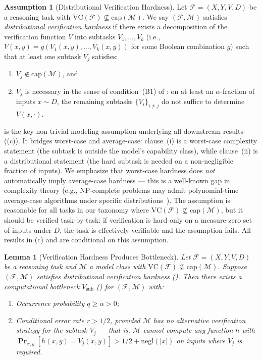\documentclass{article}
\newtheorem{lemma}[theorem]{Lemma}
\theoremstyle{definition}
\newtheorem{assumption}[theorem]{Assumption}
\theoremstyle{remark}
\newcommand{\NP}{\mathrm{NP}}
\newcommand{\VC}{\mathrm{VC}}           %
\newcommand{\calM}{\mathcal{M}}         %
\newcommand{\calF}{\mathcal{F}}         %
\newcommand{\negl}{\mathrm{negl}}
\renewcommand{\Pr}{\operatorname{\mathbf{Pr}}}
\begin{document}
\begin{assumption}[Distributional Verification Hardness]
\label{asm:dist_hard}
Let $\calF = (X, Y, V, D)$ be a reasoning task with $\VC(\calF) \not\subseteq \mathrm{cap}(\calM)$.
We say $(\calF, \calM)$ satisfies \emph{distributional verification hardness} if there exists a decomposition of the verification function $V$ into subtasks $V_1, \ldots, V_k$ (i.e., $V(x,y) = g(V_1(x,y), \ldots, V_k(x,y))$ for some Boolean combination $g$) such that at least one subtask $V_j$ satisfies:
\begin{enumerate}[label=(\roman*)]
    \item $V_j \notin \mathrm{cap}(\calM)$, and
    \item $V_j$ is necessary in the sense of condition~(B1) of : on at least an $\alpha$-fraction of inputs $x \sim D$, the remaining subtasks $\{V_i\}_{i \neq j}$ do not suffice to determine $V(x,\cdot)$.
\end{enumerate}
\end{assumption}

 is the key non-trivial modeling assumption underlying all downstream results ((c)).
It bridges worst-case and average-case: clause~(i) is a worst-case complexity statement (the subtask is outside the model's capability class), while clause~(ii) is a distributional statement (the hard subtask is needed on a non-negligible fraction of inputs).
We emphasize that worst-case hardness does \emph{not} automatically imply average-case hardness --- this is a well-known gap in complexity theory (e.g., $\NP$-complete problems may admit polynomial-time average-case algorithms under specific distributions~\citep{bogdanov2006average}).
The assumption is reasonable for all tasks in our taxonomy where $\VC(\calF) \not\subseteq \mathrm{cap}(\calM)$, but it should be verified task-by-task: if verification is hard only on a measure-zero set of inputs under $D$, the task is effectively verifiable and the assumption fails.
All results in (c) and  are conditional on this assumption.

\begin{lemma}[Verification Hardness Produces Bottleneck]
\label{lem:vc_to_bottleneck}
Let $\calF = (X, Y, V, D)$ be a reasoning task and $\calM$ a model class with $\VC(\calF) \not\subseteq \mathrm{cap}(\calM)$.
Suppose $(\calF, \calM)$ satisfies distributional verification hardness ().
Then there exists a computational bottleneck $V_{\mathrm{sub}}$ () for $(\calF, \calM)$ with:
\begin{enumerate}[label=(\alph*)]
    \item Occurrence probability $q \geq \alpha > 0$;
    \item Conditional error rate $r > 1/2$, provided $\calM$ has no alternative verification strategy for the subtask $V_j$ --- that is, $\calM$ cannot compute any function $h$ with $\Pr_{x,y}[h(x,y) = V_j(x,y)] > 1/2 + \negl(|x|)$ on inputs where $V_j$ is required.
\end{enumerate}
\end{lemma}
\end{document}

